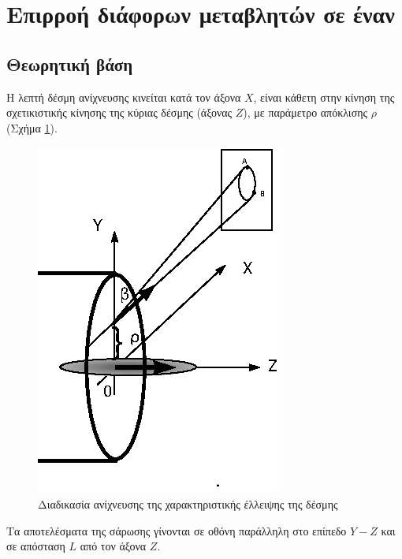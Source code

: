 \section{Επιρροή διάφορων μεταβλητών σε έναν }
\subsection{Θεωρητική βάση}
Η λεπτή δέσμη ανίχνευσης κινείται κατά τον άξονα $X$, είναι κάθετη στην κίνηση της σχετικιστικής κίνησης της κύριας δέσμης (άξονας $Z$), με παράμετρο απόκλισης $\rho$ (Σχήμα \ref{fig:ellipse-EBS}).

\begin{figure}[tph]
\includegraphics{figures/Logatchov1999-EBS}
\centering
\caption{Διαδικασία ανίχνευσης της χαρακτηριστικής έλλειψης της δέσμης}
\label{fig:ellipse-EBS}
\end{figure}

Τα αποτελέσματα της σάρωσης γίνονται  σε οθόνη παράλληλη στο επίπεδο $Y-Z$ και σε απόσταση $L$ από τον άξονα $Z$.

